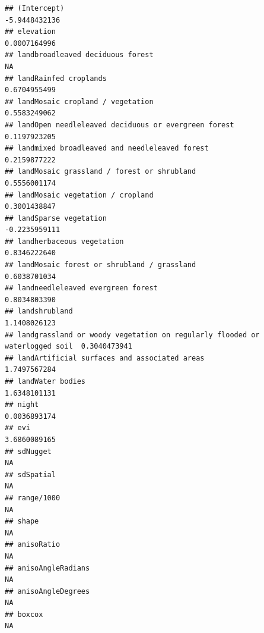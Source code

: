 \documentclass[
]{article}
\newenvironment{Shaded}{\begin{snugshade}}{\end{snugshade}}
\newcommand{\NormalTok}[1]{#1}
\newcommand{\SpecialCharTok}[1]{\textcolor[rgb]{0.81,0.36,0.00}{\textbf{#1}}}
\begin{document}
\begin{verbatim}
## (Intercept)                                                                -5.9448432136
## elevation                                                                   0.0007164996
## landbroadleaved deciduous forest                                                      NA
## landRainfed croplands                                                       0.6704955499
## landMosaic cropland / vegetation                                            0.5583249062
## landOpen needleleaved deciduous or evergreen forest                         0.1197923205
## landmixed broadleaved and needleleaved forest                               0.2159877222
## landMosaic grassland / forest or shrubland                                  0.5556001174
## landMosaic vegetation / cropland                                            0.3001438847
## landSparse vegetation                                                      -0.2235959111
## landherbaceous vegetation                                                   0.8346222640
## landMosaic forest or shrubland / grassland                                  0.6038701034
## landneedleleaved evergreen forest                                           0.8034803390
## landshrubland                                                               1.1408026123
## landgrassland or woody vegetation on regularly flooded or waterlogged soil  0.3040473941
## landArtificial surfaces and associated areas                                1.7497567284
## landWater bodies                                                            1.6348101131
## night                                                                       0.0036893174
## evi                                                                         3.6860089165
## sdNugget                                                                              NA
## sdSpatial                                                                             NA
## range/1000                                                                            NA
## shape                                                                                 NA
## anisoRatio                                                                            NA
## anisoAngleRadians                                                                     NA
## anisoAngleDegrees                                                                     NA
## boxcox                                                                                NA
\end{verbatim}

\begin{Shaded}
\end{Shaded}
\end{document}
